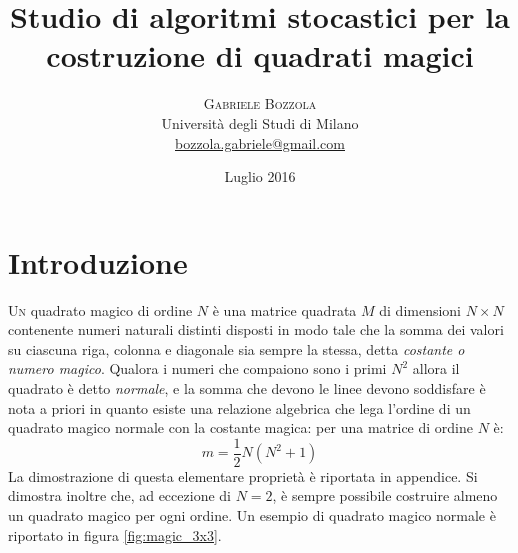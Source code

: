 \documentclass[italian,twoside,twocolumn]{article}
\title{Studio di algoritmi stocastici per la costruzione di quadrati magici} %
\author{%
\textsc{Gabriele Bozzola} \\[1ex] %
\normalsize Università degli Studi di Milano \\ %
\normalsize \href{mailto:bozzola.gabriele@gmail.com}{bozzola.gabriele@gmail.com} %
}
\date{Luglio 2016} %
\begin{document}
\maketitle


\section{Introduzione}

\lettrine[nindent=0em,lines=3]{U}n quadrato magico di ordine $ N $ è una matrice quadrata  $ M $  di dimensioni $ N\times N $ contenente numeri naturali distinti disposti in modo tale che la somma dei valori su ciascuna riga, colonna e diagonale sia sempre la stessa, detta \emph{costante o numero magico}. Qualora i numeri che compaiono sono i primi $ N^2 $ allora il quadrato è detto \emph{normale}, e la somma che devono le linee devono soddisfare è nota a priori in quanto esiste una relazione algebrica che lega l'ordine di un quadrato magico normale con la costante magica: per una matrice di ordine $ N $ è:
\[	 \mathit{m} = \frac{1}{2} N (N^2 + 1)	\]
La dimostrazione di questa elementare proprietà è riportata in appendice. Si dimostra inoltre che, ad eccezione di $ N = 2 $, è sempre possibile costruire almeno un quadrato magico per ogni ordine. Un esempio di quadrato magico normale è riportato in figura \ref{fig:magic_3x3}.
\end{document}
